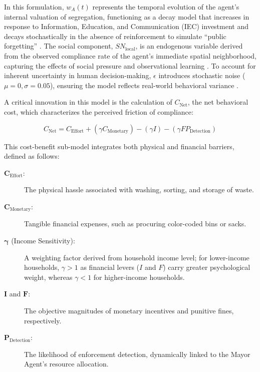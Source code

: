 In this formulation, $w_A(t)$ represents the temporal evolution of the agent's internal valuation of segregation, functioning as a decay model that increases in response to Information, Education, and Communication (IEC) investment and decays stochastically in the absence of reinforcement to simulate ``public forgetting'' \citep{Trushna2024}. The social component, $SN_{\mathrm{local}}$, is an endogenous variable derived from the observed compliance rate of the agent's immediate spatial neighborhood, capturing the effects of social pressure and observational learning \citep{Meng2018, Liao2024}. To account for inherent uncertainty in human decision-making, $\epsilon$ introduces stochastic noise ($\mu=0, \sigma=0.05$), ensuring the model reflects real-world behavioral variance \citep{Subedi2025}.

A critical innovation in this model is the calculation of $C_{\mathrm{Net}}$, the net behavioral cost, which characterizes the perceived friction of compliance:

\begin{equation}
    C_{\mathrm{Net}} = C_{\mathrm{Effort}} + (\gamma C_{\mathrm{Monetary}}) - (\gamma I) - (\gamma F P_{\mathrm{Detection}})
    \label{eq:net_disutility}
\end{equation}

\noindent This cost-benefit sub-model integrates both physical and financial barriers, defined as follows:

\begin{description}
    \item[$\bm{C_{\mathrm{Effort}}}$:] The physical hassle associated with washing, sorting, and storage of waste.
    \item[$\bm{C_{\mathrm{Monetary}}}$:] Tangible financial expenses, such as procuring color-coded bins or sacks.
    \item[$\bm{\gamma}$ (Income Sensitivity):] A weighting factor derived from household income level; for lower-income households, $\gamma > 1$ as financial levers ($I$ and $F$) carry greater psychological weight, whereas $\gamma < 1$ for higher-income households.
    \item[$\bm{I}$ and $\bm{F}$:] The objective magnitudes of monetary incentives and punitive fines, respectively.
    \item[$\bm{P_{\mathrm{Detection}}}$:] The likelihood of enforcement detection, dynamically linked to the Mayor Agent's resource allocation.
\end{description}

